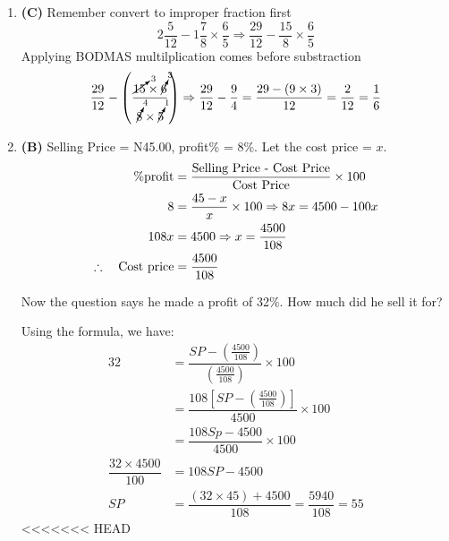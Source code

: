 \begin{multicols}{2}
\begin{enumerate}[label={\textbf{\arabic*.}}]
\begin{enumerate}[label={\arabic*.}]
    \item \textbf{(C)} Remember convert to improper fraction first
    \[2\frac{5}{12} - 1\frac{7}{8} \times \frac{6}{5} \Rightarrow \frac{29}{12} - \frac{15}{8} \times \frac{6}{5}\]
    Applying BODMAS multilplication comes before substraction\\
    \[\dfrac{29}{12} - \left(\dfrac{\cancelto{3}{15} \times \cancelto{3}{6}}{\cancelto{4}{8} \times \cancelto{1}{5}}\right) \Rightarrow \dfrac{29}{12} - \dfrac{9}{4} = \dfrac{29 - (9 \times 3)}{12} = \frac{2}{12} = \frac{1}{6}\]

    \item \textbf{(B)} Selling Price = N45.00, profit\% = 8\%.
    Let the cost price = \(x\).
    \begin{align*}
    \%\text{profit} &= \frac{\text{Selling Price - Cost Price}}{\text{Cost Price}} \times 100 \\
    8 &= \frac{45 - x}{x} \times 100 \Rightarrow 8x = 4500 - 100x \\
    108x &= 4500 \Rightarrow x = \dfrac{4500}{108} \\
    \therefore \hspace{10px} \text{Cost price} &= \dfrac{4500}{108}
    \end{align*}
    
    Now the question says he made a profit of 32\%. How much did he sell it for?
    
    Using the formula, we have:
    \begin{align*}
    32 &= \dfrac{SP - \left(\frac{4500}{108}\right)}{\left(\frac{4500}{108}\right)} \times 100 \\
    &= \dfrac{108\left[SP - \left(\frac{4500}{108}\right)\right]}{4500} \times 100 \\
    &= \dfrac{108Sp - 4500}{4500} \times 100 \\
    \dfrac{32 \times 4500}{100} &= 108SP - 4500 \\
    SP &= \dfrac{(32 \times 45) + 4500}{108} = \dfrac{5940}{108} = 55
    \end{align*}
<<<<<<< HEAD


\end{enumerate}
\end{enumerate}
\end{multicols}
